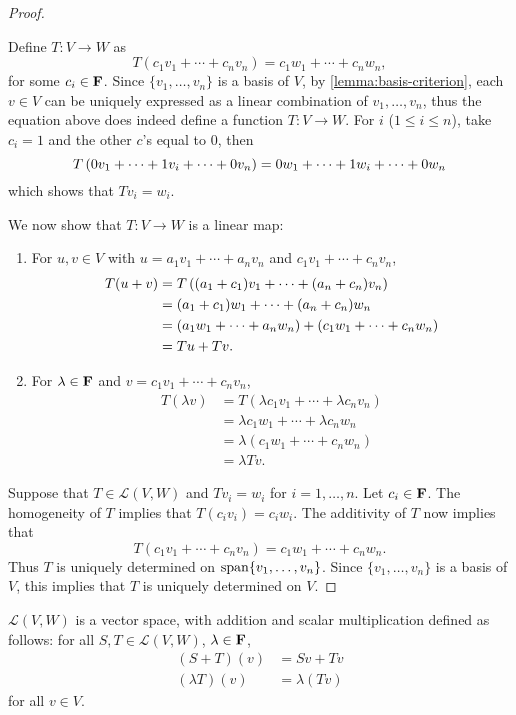 \begin{proof} \

 Define $T\colon V\to W$ as
\[T(c_1v_1+\cdots+c_nv_n)=c_1w_1+\cdots+c_nw_n,\]
for some $c_i\in\mathbf F$. Since $\{v_1,\dots,v_n\}$ is a basis of $V$, by \ref{lemma:basis-criterion}, each $v\in V$ can be uniquely expressed as a linear combination of $v_1,\dots,v_n$, thus the equation above does indeed define a function $T\colon V\to W$. For $i$ ($1\le i\le n$), take $c_i=1$ and the other $c$'s equal to $0$, then
\[T\left(0v_1+\cdots+1v_i+\cdots+0v_n\right)=0w_1+\cdots+1w_i+\cdots+0w_n\]
which shows that $Tv_i=w_i$.

We now show that $T\colon V\to W$ is a linear map:
\begin{enumerate}[label=(\roman*)]
\item For $u,v\in V$ with $u=a_1v_1+\cdots+a_nv_n$ and $c_1v_1+\cdots+c_nv_n$,
\begin{align*}
T(u+v)&=T\left((a_1+c_1)v_1+\cdots+(a_n+c_n)v_n\right)\\
&=(a_1+c_1)w_1+\cdots+(a_n+c_n)w_n\\
&=(a_1w_1+\cdots+a_nw_n)+(c_1w_1+\cdots+c_nw_n)\\
&=Tu+Tv.
\end{align*}

\item For $\lambda\in\mathbf F$ and $v=c_1v_1+\cdots+c_nv_n$,
\begin{align*}
T(\lambda v)&=T(\lambda c_1v_1+\cdots+\lambda c_nv_n)\\
&=\lambda c_1w_1+\cdots+\lambda c_nw_n\\
&=\lambda(c_1w_1+\cdots+c_nw_n)\\
&=\lambda Tv.
\end{align*}
\end{enumerate}

 Suppose that $T\in\mathcal{L}(V,W)$ and $Tv_i=w_i$ for $i=1,\dots,n$. Let $c_i\in\mathbf F$. The homogeneity of $T$ implies that $T(c_iv_i)=c_iw_i$. The additivity of $T$ now implies that 
\[T(c_1v_1+\cdots+c_nv_n)=c_1w_1+\cdots+c_nw_n.\]
Thus $T$ is uniquely determined on $\operatorname{span}\{v_1,\dots,v_n\}$. Since $\{v_1,\dots,v_n\}$ is a basis of $V$, this implies that $T$ is uniquely determined on $V$.
\end{proof}

\begin{lemma}
$\mathcal{L}(V,W)$ is a vector space, with addition and scalar multiplication defined as follows: for all $S,T\in\mathcal{L}(V,W)$, $\lambda\in\mathbf F$,
\begin{align*}
(S+T)(v)&=Sv+Tv\\
(\lambda T)(v)&=\lambda(Tv)
\end{align*}
for all $v\in V$.
\end{lemma}

